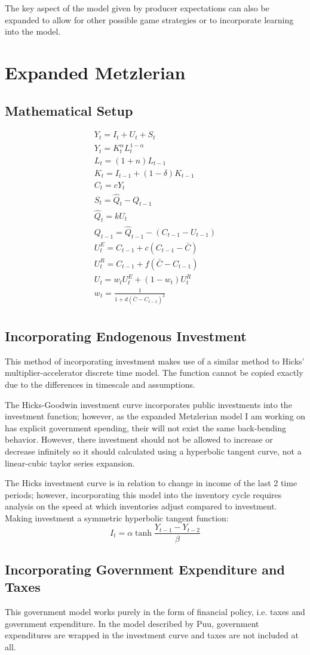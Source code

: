 \documentclass[]{article}
\begin{document}
The key aspect of the model given by producer expectations can also be expanded to allow for other possible game strategies or to incorporate learning into the model. 
\pagebreak
\section{Expanded Metzlerian}
\subsection*{Mathematical Setup}
\begin{gather*}
	Y_t = I_t + U_t + S_t\\
	Y_t = K_t^\alpha L_t^{1-\alpha}\\
	L_t = (1+n) L_{t-1}\\
	K_t = I_{t-1} + (1-\delta) K_{t-1}\\
	C_t = cY_t\\
	S_t=\hat Q_t-Q_{t-1}\\
	\hat Q_t=k U_t\\
	Q_{t-1}=\hat Q_{t-1}-(C_{t-1}-U_{t-1})\\
	U_t^E=C_{t-1}+c(C_{t-1}-\bar C)\\
	U_t^R=C_{t-1}+f(\bar C-C_{t-1})\\
	U_t=w_tU_t^E+(1-w_t)U_t^R\\
	w_t=\frac{1}{1+d(\bar C-C_{t-1})^2}\\
\end{gather*}
\subsection*{Incorporating Endogenous Investment}
This method of incorporating investment makes use of a similar method to Hicks' multiplier-accelerator discrete time model. The function cannot be copied exactly due to the differences in timescale and assumptions. 

The Hicks-Goodwin investment curve incorporates public investments into the investment function; however, as the expanded Metzlerian model I am working on has explicit government spending, their will not exist the same back-bending behavior. However, there investment should not be allowed to increase or decrease infinitely so it should calculated using a hyperbolic tangent curve, not a linear-cubic taylor series expansion.

The Hicks investment curve is in relation to change in income of the last 2 time periods; however, incorporating this model into the inventory cycle requires analysis on the speed at which inventories adjust compared to investment. 
	Making investment a symmetric hyperbolic tangent function:
	\begin{equation*}
		I_t = \alpha \tanh \frac{Y_{t-1}-Y_{t-2}}{\beta}
	\end{equation*}

\subsection*{Incorporating Government Expenditure and Taxes}
This government model works purely in the form of financial policy, i.e. taxes and government expenditure. In the model described by Puu, government expenditures are wrapped in the investment curve and taxes are not included at all. 
\end{document}
